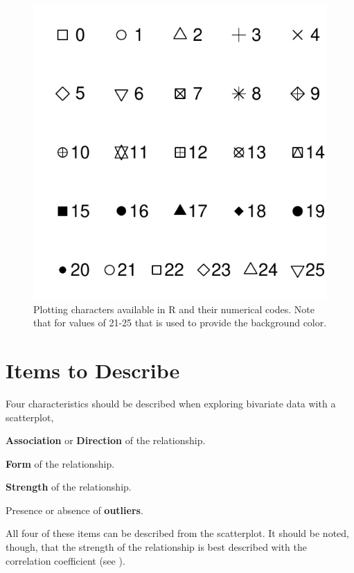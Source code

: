 \documentclass[10pt,openany]{book}\usepackage[]{graphicx}\usepackage[]{color}
\newenvironment{knitrout}{}{} %
\begin{document}
\begin{knitrout}
\color{fgcolor}\begin{figure}[hbtp]

{\centering \includegraphics[width=.4\linewidth]{Figs/Rpch-1} 

}

\caption[Plotting characters available in R and their numerical codes]{Plotting characters available in R and their numerical codes. Note that for values of 21-25 that  is used to provide the background color.}\label{fig:Rpch}
\end{figure}


\end{knitrout}


\newpage
\section{Items to Describe}
\vspace{-12pt}
Four characteristics should be described when exploring bivariate data with a scatterplot,
\begin{Enumerate}
  \item \textbf{Association} or \textbf{Direction} of the relationship.
  \item \textbf{Form} of the relationship.
  \item \textbf{Strength} of the relationship.
  \item Presence or absence of \textbf{outliers}.
\end{Enumerate}
All four of these items can be described from the scatterplot.  It should be noted, though, that the strength of the relationship is best described with the correlation coefficient (see ).
\end{document}
